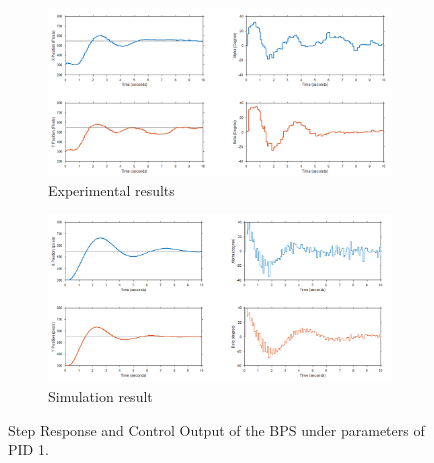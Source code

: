\begin{figure}[h]
     \centering
     \begin{subfigure}[b]{1\textwidth}
         \centering
         \includegraphics[width=\textwidth]{Figures/chapter05/Step_response_PID1_Expiremental.png}
         \caption{Experimental results}
         \label{fig:y equals x}
     \end{subfigure}
     \hfill
     \begin{subfigure}[b]{1\textwidth}
         \centering
         \includegraphics[width=\textwidth]{Figures/chapter05/Step_response_PID1_Simulation.png}
         \caption{Simulation result}
         \label{fig:three sin x}
     \end{subfigure}
        \caption{Step Response and Control Output of the  BPS under parameters of PID 1.}
        \label{fig:three graphs}
\end{figure}
